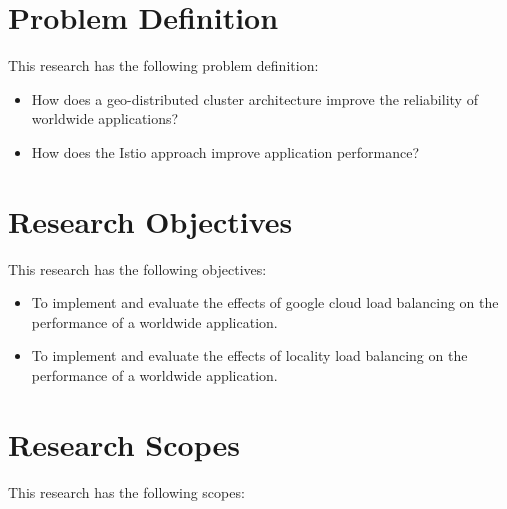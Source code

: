 \section{Problem Definition}
\label{sec:definisiMasalah}

This research has the following problem definition:
\begin{itemize}
    \item How does a geo-distributed cluster architecture improve the reliability of worldwide applications?
    \item How does the Istio approach improve application performance?
\end{itemize}



\section{Research Objectives}
\label{sec:tujuan}
This research has the following objectives:
\begin{itemize}
	\item To implement and evaluate the effects of google cloud load balancing on the performance of a worldwide application.
    \item To implement and evaluate the effects of locality load balancing on the performance of a worldwide application.
\end{itemize}

\section{Research Scopes}
\label{sec:batasanMasalah}
This research has the following scopes:

